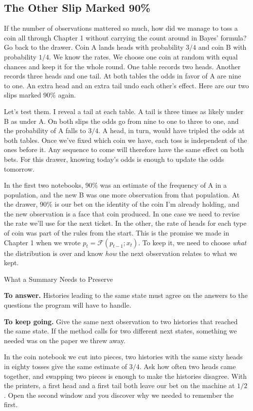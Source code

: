 \documentclass[12pt,oneside]{article}
\newcommand{\secao}[1]{\Needspace{5.2\baselineskip}\subsection*{#1}}
\newcommand{\itemq}[1]{\par\textbf{#1.}\enspace}
\begin{document}
\secao{The Other Slip Marked 90\%}
If the number of observations mattered so much, how did we manage to toss a coin all through Chapter 1 without carrying the count around in Bayes' formula? Go back to the drawer. Coin A lands heads with probability $3/4$ and coin B with probability $1/4$. We know the rates. We choose one coin at random with equal chances and keep it for the whole round. One table records two heads. Another records three heads and one tail. At both tables the odds in favor of A are nine to one. An extra head and an extra tail undo each other's effect. Here are our two slips marked $90\%$ again.

Let's test them. I reveal a tail at each table. A tail is three times as likely under B as under A. On both slips the odds go from nine to one to three to one, and the probability of A falls to $3/4$. A head, in turn, would have tripled the odds at both tables. Once we've fixed which coin we have, each toss is independent of the ones before it. Any sequence to come will therefore have the same effect on both bets. For this drawer, knowing today's odds is enough to update the odds tomorrow.

In the first two notebooks, $90\%$ was an estimate of the frequency of A in a population, and the new B was one more observation from that population. At the drawer, $90\%$ is our bet on the identity of the coin I'm already holding, and the new observation is a face that coin produced. In one case we need to revise the rate we'll use for the next ticket. In the other, the rate of heads for each type of coin was part of the rules from the start. This is the promise we made in Chapter 1 when we wrote $p_t=\mathcal F(p_{t-1};x_t)$. To keep it, we need to choose \emph{what} the distribution is over and know \emph{how} the next observation relates to what we kept.

\begin{quadro}{What a Summary Needs to Preserve}
\itemq{To answer} Histories leading to the same state must agree on the answers to the questions the program will have to handle.
\itemq{To keep going} Give the same next observation to two histories that reached the same state. If the method calls for two different next states, something we needed was on the paper we threw away.
\end{quadro}

In the coin notebook we cut into pieces, two histories with the same sixty heads in eighty tosses give the same estimate of $3/4$. Ask how often two heads came together, and swapping two pieces is enough to make the histories disagree. With the printers, a first head and a first tail both leave our bet on the machine at $1/2$. Open the second window and you discover why we needed to remember the first.
\end{document}
